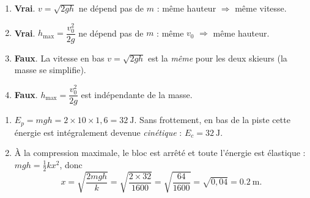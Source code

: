 \documentclass[11pt,a4paper]{article}
\begin{document}
\begin{corrige}
\begin{enumerate}[label=\alph*)]
  \item \textbf{Vrai}. $v=\sqrt{2gh}$ ne dépend pas de $m$ : même hauteur $\Rightarrow$ même vitesse.
  \item \textbf{Vrai}. $h_{\max}=\dfrac{v_0^2}{2g}$ ne dépend pas de $m$ : même $v_0$ $\Rightarrow$ même hauteur.
  \item \textbf{Faux}. La vitesse en bas $v=\sqrt{2gh}$ est la \emph{même} pour les deux skieurs
        (la masse se simplifie).
  \item \textbf{Faux}. $h_{\max}=\dfrac{v_0^2}{2g}$ est indépendante de la masse.
\end{enumerate}
\end{corrige}

\begin{corrige}
\begin{enumerate}[label=\alph*)]
  \item $E_p=mgh=2\times10\times1,6=\qty{32}{\joule}$. Sans frottement, en bas de la piste cette
        énergie est intégralement devenue \emph{cinétique} : $E_c=\qty{32}{\joule}$.
  \item À la compression maximale, le bloc est arrêté et toute l'énergie est élastique :
        $mgh=\tfrac12 k x^2$, donc
        \[
        x=\sqrt{\frac{2mgh}{k}}=\sqrt{\frac{2\times32}{1600}}=\sqrt{\frac{64}{1600}}=\sqrt{0,04}=\qty{0,2}{\metre}.
        \]
\end{enumerate}
\end{corrige}
\end{document}

